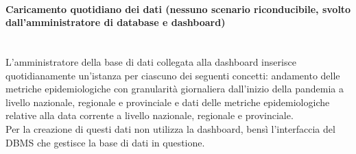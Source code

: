 \paragraph{Caricamento quotidiano dei dati (nessuno scenario riconducibile, svolto dall'amministratore di database e dashboard)}\mbox{}\\
L'amministratore della base di dati collegata alla dashboard inserisce quotidianamente un'istanza per ciascuno dei seguenti concetti: andamento delle metriche epidemiologiche con granularità giornaliera dall'inizio della pandemia a livello nazionale, regionale e provinciale e dati delle metriche epidemiologiche relative alla data corrente a livello nazionale, regionale e provinciale.\\
Per la creazione di questi dati non utilizza la dashboard, bensì l'interfaccia del DBMS che gestisce la base di dati in questione.
